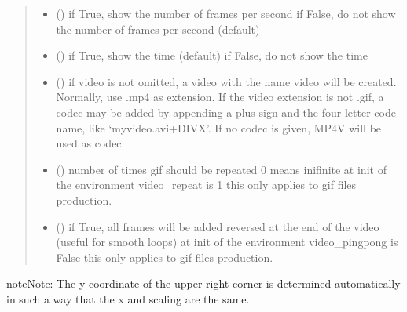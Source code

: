 \documentclass[letterpaper,10pt,english]{sphinxmanual}
\begin{document}
\begin{fulllineitems}
\begin{fulllineitems}
\begin{quote}
\begin{description}
\begin{itemize}
\item {} 
 () \textendash{} if True, show the number of frames per second 
if False, do not show the number of frames per second (default)

\item {} 
 () \textendash{} if True, show the time (default)  
if False, do not show the time

\item {} 
 () \textendash{} if video is not omitted, a video with the name video
will be created. 
Normally, use .mp4 as extension. 
If the video extension is not .gif, a codec may be added
by appending a plus sign and the four letter code name,
like ‘myvideo.avi+DIVX’. 
If no codec is given, MP4V will be used as codec.

\item {} 
 () \textendash{} number of times gif should be repeated 
0 means inifinite 
at init of the environment video\_repeat is 1 
this only applies to gif files production.

\item {} 
 () \textendash{} if True, all frames will be added reversed at the end of the video (useful for smooth loops)
at init of the environment video\_pingpong is False 
this only applies to gif files production.

\end{itemize}

\end{description}\end{quote}

\begin{sphinxadmonition}{note}{Note:}
The y-coordinate of the upper right corner is determined automatically
in such a way that the x and scaling are the same. 
\end{sphinxadmonition}

\end{fulllineitems}



\end{fulllineitems}
\end{document}
